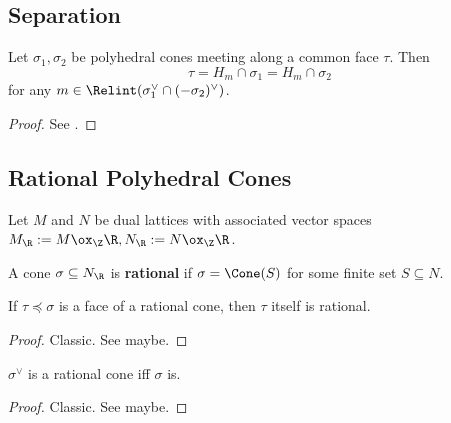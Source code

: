 \subsection{Separation}


\begin{lemma}
  \label{03-separation-lemma}

  Let $\sigma_1, \sigma_2$ be polyhedral cones meeting along a common face $\tau$. Then
  $$\tau = H_m \cap \sigma_1 = H_m \cap \sigma_2$$
  for any $m \in \Relint(\sigma_1^\vee \cap (-\sigma_2)^\vee)$.
\end{lemma}
\begin{proof}

  See \cite{Cox_2011}.
\end{proof}


\subsection{Rational Polyhedral Cones}


Let $M$ and $N$ be dual lattices with associated vector spaces $M_\R := M \ox_\Z \R, N_\R := N \ox_\Z \R$.


\begin{definition}
  \label{04-rat-cone}

  A cone $\sigma \subseteq N_\R$ is {\bf rational} if $\sigma = \Cone(S)$ for some finite set $S \subseteq N$.
\end{definition}


\begin{lemma}
  \label{04-face-rat-cone}

  If $\tau \preceq \sigma$ is a face of a rational cone, then $\tau$ itself is rational.
\end{lemma}
\begin{proof}
  \uses{}

  Classic. See \cite{Oda_1988} maybe.
\end{proof}


\begin{lemma}
  \label{04-dual-rat-cone}

  $\sigma^\vee$ is a rational cone iff $\sigma$ is.
\end{lemma}
\begin{proof}
  \uses{}

  Classic. See \cite{Oda_1988} maybe.
\end{proof}


